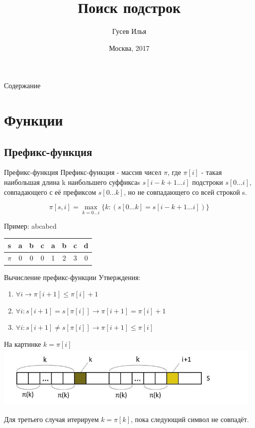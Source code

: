 \documentclass[10pt]{beamer}
\title[\href{https://goo.gl/NRgp8K}{https://goo.gl/NRgp8K} (Term 1)]{Поиск подстрок}
\author[Гусев Илья]{Гусев Илья}
\institute[МФТИ] 
{Московский физико-технический институт\\*}
\date{Москва, 2017}
\begin{document}
\begin{frame}
  \titlepage
\end{frame}

\begin{frame}{Содержание}
\tableofcontents
\end{frame}

\section{Функции}

\subsection{Префикс-функция}
\begin{frame}[fragile]{Префикс-функция}
Префикс-функция - массив чисел $\pi$, где $\pi[i]$ - такая наибольшая длина k наибольшего суффиксаs $s[i-k+1\ldots i]$ подстроки $s[0 \ldots i]$, совпадающего с её префиксом $s[0\dots k]$, но не совпадающего со всей строкой s.


\[\pi[s, i] = \max_{k=0 \ldots i} \{k: (s[0\dots k] = s[i-k+1\ldots i]) \}\]


Пример: abcabcd
\begin{center}
\begin{tabular}{ |c|ccccccc| } 
 \hline
 s & a & b & c & a & b & c & d \\ 
  \hline
$\pi$ & 0 & 0 & 0 & 1 & 2 & 3 & 0 \\ 
 \hline
\end{tabular}
\end{center}
\end{frame}

\begin{frame}[fragile]{Вычисление префикс-функции}
Утверждения:
\begin{enumerate}
\item $\forall i \rightarrow \pi[i+1] \leqslant \pi[i] + 1$
\item $\forall i:s[i+1] = s[\pi[i]] \rightarrow \pi[i+1] = \pi[i] + 1$
\item $\forall i:s[i+1] \ne s[\pi[i]] \rightarrow \pi[i+1] \le \pi[i]$
\end{enumerate}
На картинке $k = \pi[i]$
\includegraphics[width=13cm, height=3cm]{Term_3/Source/Pictures/prefix.jpg}


Для третьего случая итерируем $k = \pi[k]$, пока следующий символ не совпадёт.
\end{frame}
\end{document}
